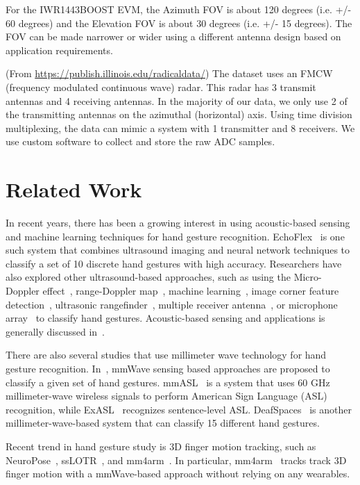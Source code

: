 \documentclass[11pt, oneside]{article}   	%
\begin{document}
For the IWR1443BOOST EVM, the Azimuth FOV is about 120 degrees (i.e. +/- 60 degrees) and the Elevation FOV is about 30 degrees (i.e. +/- 15 degrees). The FOV can be made narrower or wider using a different antenna design based on application requirements.


(From \url{https://publish.illinois.edu/radicaldata/}) The dataset uses an FMCW (frequency modulated continuous wave) radar. This radar has 3 transmit antennas and 4 receiving antennas. In the majority of our data, we only use 2 of the transmitting antennas on the azimuthal (horizontal) axis. Using time division multiplexing, the data can mimic a system with 1 transmitter and 8 receivers. We use custom software to collect and store the raw ADC samples.


\section{Related Work}
In recent years, there has been a growing interest in using acoustic-based sensing and machine learning techniques for hand gesture recognition. EchoFlex~\cite{ref:echoflex17} is one such system that combines ultrasound imaging and neural network techniques to classify a set of 10 discrete hand gestures with high accuracy. Researchers have also explored other ultrasound-based approaches, such as using the Micro-Doppler effect~\cite{ref:usgr19}, range-Doppler map~\cite{ref:hgr22}, machine learning~\cite{ref:mhgr18}, image corner feature detection~\cite{ref:usgdr21}, ultrasonic rangefinder~\cite{ref:ss12}, multiple receiver antenna~\cite{ref:usgr18}, or microphone array~\cite{ref:usgr17} to classify hand gestures.  Acoustic-based sensing and applications is generally discussed in~\cite{ref:absa20}. 

There are also several studies that use millimeter wave technology for hand gesture recognition. In~\cite{ref:hgrmmv21, ref:slgrmmw22}, mmWave sensing based approaches are proposed to classify a given set of hand gestures. mmASL~\cite{ref:mmasl} is a system that uses 60 GHz millimeter-wave wireless signals to perform American Sign Language (ASL) recognition, while ExASL~\cite{ref:exasl20} recognizes sentence-level ASL. DeafSpaces~\cite{ref:deafspaces21} is another millimeter-wave-based system that can classify 15 different hand gestures. 

Recent trend in hand gesture study is 3D finger motion tracking, such as NeuroPose~\cite{ref:neuropose21}, ssLOTR~\cite{ref:sslotr22}, and mm4arm~\cite{ref:mm4arm23}. In particular, mm4arm~\cite{ref:mm4arm23} tracks track 3D finger motion with a mmWave-based approach without relying on any wearables.
\end{document}
